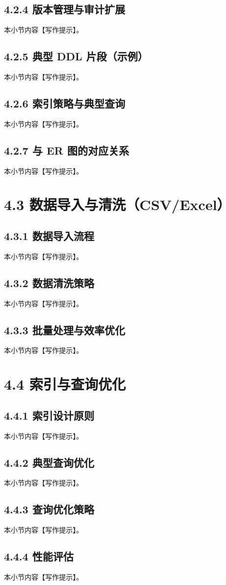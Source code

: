 \subsection{4.2.4 版本管理与审计扩展}
本小节内容【写作提示】。
\subsection{4.2.5 典型 DDL 片段（示例）}
本小节内容【写作提示】。
\subsection{4.2.6 索引策略与典型查询}
本小节内容【写作提示】。
\subsection{4.2.7 与 ER 图的对应关系}
本小节内容【写作提示】。
\section{4.3 数据导入与清洗（CSV/Excel）}
\subsection{4.3.1 数据导入流程}
本小节内容【写作提示】。
\subsection{4.3.2 数据清洗策略}
本小节内容【写作提示】。
\subsection{4.3.3 批量处理与效率优化}
本小节内容【写作提示】。
\section{4.4 索引与查询优化}
\subsection{4.4.1 索引设计原则}
本小节内容【写作提示】。
\subsection{4.4.2 典型查询优化}
本小节内容【写作提示】。
\subsection{4.4.3 查询优化策略}
本小节内容【写作提示】。
\subsection{4.4.4 性能评估}
本小节内容【写作提示】。
